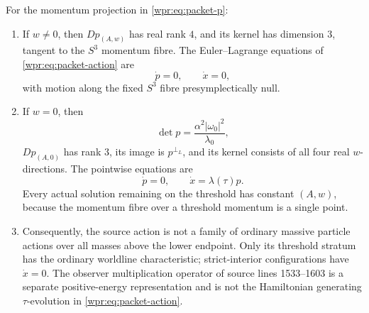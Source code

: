 \begin{theorem}
\label{wpr:thm:packet-action}
For the momentum projection in \eqref{wpr:eq:packet-p}:
\begin{enumerate}[label=\textup{(\roman*)}]
\item If \(w\neq0\), then \(D p_{(A,w)}\) has real rank \(4\), and its
kernel has dimension \(3\), tangent to the \(S^3\) momentum fibre.
The Euler--Lagrange equations of \eqref{wpr:eq:packet-action} are
\[
 \dot p=0,\qquad \dot x=0,
\]
with motion along the fixed \(S^3\) fibre presymplectically null.
\item If \(w=0\), then
\[
 \det p=\frac{\alpha^2|\omega_0|^2}{\lambda_0},
\]
\(D p_{(A,0)}\) has rank \(3\), its image is
\(p^{\perp_L}\), and its kernel consists of all four real
\(w\)-directions.  The pointwise equations are
\[
 \dot p=0,\qquad \dot x=\lambda(\tau)p.
\]
Every actual solution remaining on the threshold has constant
\((A,w)\), because the momentum fibre over a threshold momentum is a
single point.
\item Consequently, the source action is not a family of ordinary
massive particle actions over all masses above the lower endpoint.
Only its threshold stratum has the ordinary worldline characteristic;
strict-interior configurations have \(\dot x=0\).  The observer
multiplication operator of source lines 1533--1603 is a separate
positive-energy representation and is not the Hamiltonian generating
\(\tau\)-evolution in \eqref{wpr:eq:packet-action}.
\end{enumerate}
\end{theorem}

